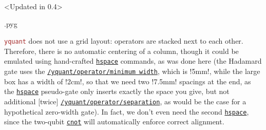 \documentclass{scrartcl}
\makeatletter
\newenvironment{codeexample}{%
   \VerbatimEnvironment%
   \let\FVB@VerbatimOut\minted@FVB@VerbatimOut
   \let\FVE@VerbatimOut\minted@FVE@VerbatimOut
   \minted@configlang{tex}%
   \minted@fvset
   \begin{VerbatimOut}[codes={\catcode`\^^I=12},firstline,lastline]{\minted@jobname.pyg}%
}{
   \end{VerbatimOut}%
   \minted@langlinenoson%
   \savebox\codeexamplebox{ \minted@jobname.pyg}%
   \ifdim\wd\codeexamplebox>\dimexpr.5\linewidth-3mm\relax%
      \wd\codeexamplebox=.5\linewidth%
   \else%
      \wd\codeexamplebox=\dimexpr\wd\codeexamplebox+3mm\relax%
   \fi%
   \noindent\begin{minipage}{\wd\codeexamplebox}%
      \centering%
      \usebox\codeexamplebox%
   \end{minipage}%
   \begin{minipage}{\dimexpr\linewidth-\wd\codeexamplebox\relax}%
      \expandafter\minted@pygmentize\expandafter{\minted@lang}%
   \end{minipage}%
   \minted@langlinenosoff%
   \par%
}
\def\pkg#1{\textcolor{brown}{\texttt{#1}}}
\def\gate#1{\hyperref[gate:#1]{\texttt{#1}}}
\def\style#1{\hyperref[style:#1]{\texttt{#1}}}
\def\Yquant{\pkg{yquant}}
\makeatother
\begin{document}
            \begin{example}<Updated in 0.4>
               \begin{codeexample}
               \end{codeexample}
               \Yquant{} does not use a grid layout: operators are stacked next to each other.
               Therefore, there is no automatic centering of a column, though it could be emulated using hand-crafted \gate{hspace} commands, as was done here (the Hadamard gate uses the \style{/yquant/operator/minimum width}, which is \tex!5mm!, while the large box has a width of \tex!2cm!, so that we need two \tex!7.5mm! spacings at the end, as the \gate{hspace} pseudo\hyp gate only inserts exactly the space you give, but not additional [twice] \style{/yquant/operator/separation}, as would be the case for a hypothetical zero\hyp width gate).
               In fact, we don't even need the second \gate{hspace}, since the two\hyp qubit \gate{cnot} will automatically enforce correct alignment.
            \end{example}
\end{document}
